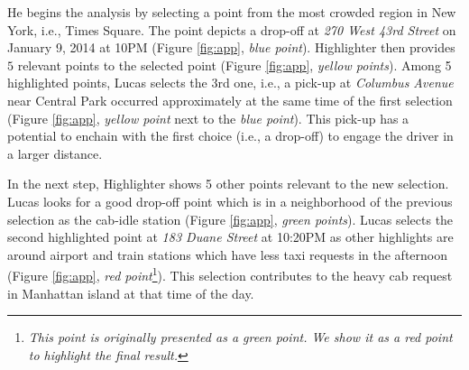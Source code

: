 He begins the analysis by selecting a point from the most crowded region in New York, i.e., Times Square. The point depicts a drop-off at {\em 270 West 43rd Street} on January 9, 2014 at 10PM (Figure \ref{fig:app}, \textit{blue point}). {\sc Highlighter} then provides $5$ relevant points to the selected point (Figure \ref{fig:app}, \textit{yellow points}).
Among 5 highlighted points, Lucas selects the 3rd one, i.e., a pick-up at {\em Columbus Avenue} near Central Park occurred approximately at the same time of the first selection (Figure \ref{fig:app}, \textit{yellow point} next to the \textit{blue point}). This pick-up has a potential to enchain with the first choice (i.e., a drop-off) to engage the driver in a larger distance.

In the next step, {\sc Highlighter} shows 5 other points relevant to the new selection. Lucas looks for a good drop-off point which is in a neighborhood of the previous selection as the cab-idle station (Figure \ref{fig:app}, \textit{green points}). Lucas selects the second highlighted point at {\em 183 Duane Street} at 10:20PM as other highlights are around airport and train stations which have less taxi requests in the afternoon (Figure \ref{fig:app},  \textit{red point}\footnote{\textit{This point is originally presented as a green point. We show it as a red point to highlight the final result.}}). This selection contributes to the heavy cab request in Manhattan island at that time of the day. 

